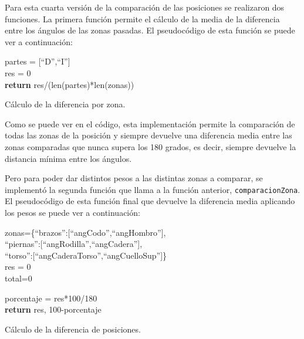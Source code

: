 {Para esta cuarta versión de la comparación de las posiciones se realizaron dos funciones. La primera función permite el cálculo de la media de la diferencia entre los ángulos de las zonas pasadas. El pseudocódigo de esta función se puede ver a continuación:

\begin{algorithm}[H]
	\SetAlgoLined
	partes = [``D'',``I'']\\
	res = 0\\
	\textbf{return} res/(len(partes)*len(zonas))
	\caption{Cálculo de la diferencia por zona.}
\end{algorithm}

Como se puede ver en el código, esta implementación permite la comparación de todas las zonas de la posición y siempre devuelve una diferencia media entre las zonas comparadas que nunca supera los 180 grados, es decir, siempre devuelve la distancia mínima entre los ángulos.

Pero para poder dar distintos pesos a las distintas zonas a comparar, se implementó la segunda función que llama a la función anterior, \texttt{comparacionZona}. El pseudocódigo de esta función final que devuelve la diferencia media aplicando los pesos se puede ver a continuación:

\begin{algorithm}[H]
	\SetAlgoLined
	zonas=\{``brazos'':[``angCodo'',``angHombro''],\\
		``piernas'':[``angRodilla'',``angCadera''],\\
		``torso'':[``angCaderaTorso'',``angCuelloSup'']\}\\
	res = 0\\
	total=0\\

	porcentaje = res*100/180\\
	\textbf{return} res, 100-porcentaje
	\caption{Cálculo de la diferencia de posiciones.}
\end{algorithm}

}
